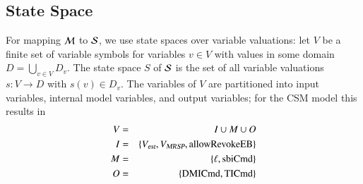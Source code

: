 \subsection{State Space}
For mapping ${\cal M}$ to ${\cal S}$,
we use state spaces over variable valuations: let   $V$ be a finite set  of variable symbols for variables $v\in V$ with values in some domain $D=\bigcup_{v\in V} D_v$.  
The state space $S$ of ${\cal S}$ is the set of all variable valuations $s : V \rightarrow D$ with $s(v) \in D_v$.   The variables of $V$ are partitioned into input variables, internal model variables, and output variables; for the CSM model this results in
\begin{eqnarray*}
V & = & I \cup M \cup O
\\
I & = & \{ {V_{\text{\sl est}}}, {V_{\text{\sl MRSP}}}, \text{allowRevokeEB} \}
\\
M & = & \{ \ell, \text{sbiCmd}  \}
\\
O & = & \{ \text{DMICmd}, \text{TICmd}  \}
\end{eqnarray*}
 
